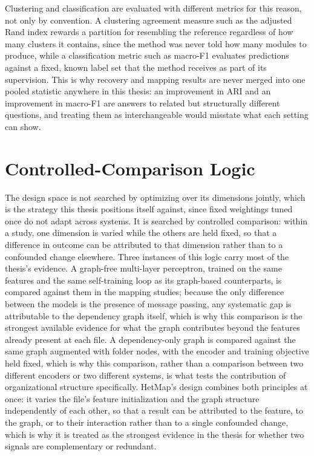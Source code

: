Clustering and classification are evaluated with different metrics for this reason, not only by convention. A clustering agreement measure such as the adjusted Rand index rewards a partition for resembling the reference regardless of how many clusters it contains, since the method was never told how many modules to produce, while a classification metric such as macro-F1 evaluates predictions against a fixed, known label set that the method receives as part of its supervision. This is why recovery and mapping results are never merged into one pooled statistic anywhere in this thesis: an improvement in ARI and an improvement in macro-F1 are answers to related but structurally different questions, and treating them as interchangeable would misstate what each setting can show.

\section{Controlled-Comparison Logic}
\label{sec:method-comparison}

The design space is not searched by optimizing over its dimensions jointly, which is the strategy this thesis positions itself against, since fixed weightings tuned once do not adapt across systems. It is searched by controlled comparison: within a study, one dimension is varied while the others are held fixed, so that a difference in outcome can be attributed to that dimension rather than to a confounded change elsewhere. Three instances of this logic carry most of the thesis's evidence. A graph-free multi-layer perceptron, trained on the same features and the same self-training loop as its graph-based counterparts, is compared against them in the mapping studies; because the only difference between the models is the presence of message passing, any systematic gap is attributable to the dependency graph itself, which is why this comparison is the strongest available evidence for what the graph contributes beyond the features already present at each file. A dependency-only graph is compared against the same graph augmented with folder nodes, with the encoder and training objective held fixed, which is why this comparison, rather than a comparison between two different encoders or two different systems, is what tests the contribution of organizational structure specifically. HetMap's design combines both principles at once: it varies the file's feature initialization and the graph structure independently of each other, so that a result can be attributed to the feature, to the graph, or to their interaction rather than to a single confounded change, which is why it is treated as the strongest evidence in the thesis for whether two signals are complementary or redundant.

